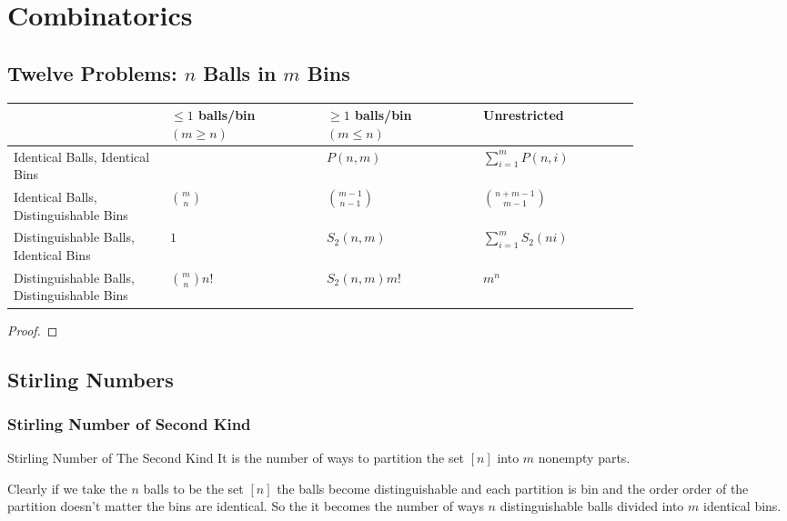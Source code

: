 \chapter{Combinatorics}
\section{Twelve Problems: {$n$} Balls in $m$ Bins}
\begin{Theorem}{}{}
	\begin{center}
		\begin{tabularx}{0.9\textwidth}{>{\raggedright}p{0.2\linewidth}|>{\centering\arraybackslash}m{0.2\linewidth} |>{\centering\arraybackslash}m{0.2\linewidth}|>{\centering\arraybackslash}m{0.2\linewidth}}
			& $\leq 1$ balls/bin $(m\geq n)$ & $\geq 1$ balls/bin $(m\leq n)$ & Unrestricted\\\hline
			Identical Balls, Identical Bins& 1 & $P(n,m)$ & $\sum\limits_{i=1}^mP(n,i)$\\[5mm]
			Identical Balls, Distinguishable Bins & $\displaystyle{\binom{m}{n}}$ & $\displaystyle{\binom{m-1}{n-1}}$ & $\displaystyle{\binom{n+m-1}{m-1}}$\\[5mm]
			Distinguishable Balls, Identical Bins & $1$ & $S_2(n,m)$ & $\sum\limits_{i=1}^mS_2(ni)$\\[5mm]
			Distinguishable Balls, Distinguishable Bins & $\displaystyle{\binom{m}{n}n!}$ & $S_2(n,m)m! $ & $m^n$
		\end{tabularx}
	\end{center}
\end{Theorem}
\begin{proof}
	
\end{proof}
\section{Stirling Numbers}
\subsection{Stirling Number of Second Kind}
\begin{Definition}{Stirling Number of The Second Kind}{}
	It is the number of ways to partition the set $[n]$ into $m$ nonempty parts. 
\end{Definition}

Clearly if we take the $n$ balls to be the set $[n]$ the balls become distinguishable and each partition is bin and the order order of the partition doesn't matter the bins are identical. So the it becomes the number of ways $n$ distinguishable balls divided into $m$ identical bins.

